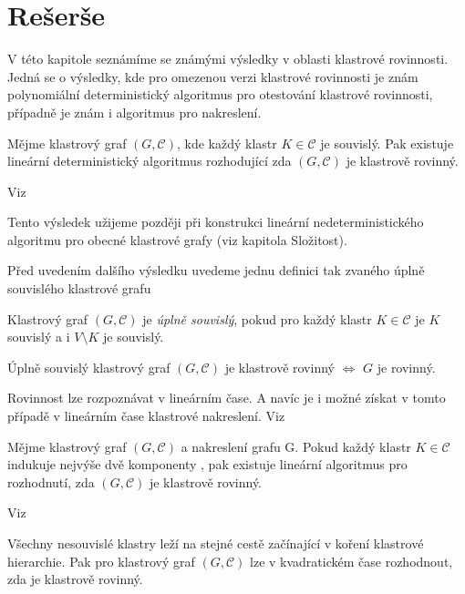 \chapter{Rešerše}
V této kapitole seznámíme se známými výsledky v oblasti klastrové rovinnosti. Jedná se o výsledky, kde pro omezenou verzi klastrové rovinnosti je znám polynomiální deterministický algoritmus pro otestování klastrové rovinnosti, případně je znám i algoritmus pro nakreslení.

\begin{theorem}
Mějme klastrový graf $(G, \mathcal C)$, kde každý klastr $K \in \mathcal C$ je souvislý. Pak existuje lineární deterministický algoritmus rozhodující zda $(G, \mathcal C)$ je klastrově rovinný.
\end{theorem}

Viz \cite{CorteseEtAl08}

Tento výsledek užijeme později při konstrukci lineární nedeterministického algoritmu pro obecné klastrové grafy (viz kapitola Složitost).

Před uvedením dalšího výsledku uvedeme jednu definici tak zvaného úplně souvislého klastrové grafu

\begin{defn}
Klastrový graf $(G, \mathcal C)$ je \textit{úplně souvislý}, pokud pro každý klastr $K \in \mathcal C$ je $K$ souvislý a i $V \setminus K$ je souvislý.
\end{defn}

\begin{theorem}
Úplně souvislý klastrový graf $(G, \mathcal C)$ je  klastrově rovinný $\iff$ $G$ je rovinný.
\end{theorem}

Rovinnost lze rozpoznávat v lineárním čase. A navíc je i možné získat v tomto případě v lineárním čase klastrové nakreslení.
Viz \cite{CornelsenWagner03}

\begin{theorem}
Mějme klastrový graf $(G, \mathcal C)$ a nakreslení grafu G. Pokud každý klastr $K \in \mathcal C$ indukuje nejvýše dvě komponenty , pak existuje lineární algoritmus pro rozhodnutí, zda $(G, \mathcal C)$ je klastrově rovinný.
\end{theorem}

Viz \cite{JelinekEtAl08}

\begin{theorem}
Všechny nesouvislé klastry leží na stejné cestě začínající v koření klastrové hierarchie. Pak pro klastrový graf $(G, \mathcal C)$ lze v kvadratickém čase rozhodnout, zda je klastrově rovinný.
\end{theorem}

